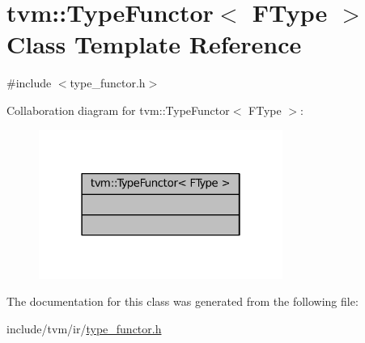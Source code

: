 \hypertarget{classtvm_1_1TypeFunctor}{}\section{tvm\+:\+:Type\+Functor$<$ F\+Type $>$ Class Template Reference}
\label{classtvm_1_1TypeFunctor}


{\ttfamily \#include $<$type\+\_\+functor.\+h$>$}



Collaboration diagram for tvm\+:\+:Type\+Functor$<$ F\+Type $>$\+:
\nopagebreak
\begin{figure}[H]
\begin{center}
\leavevmode
\includegraphics[width=226pt]{classtvm_1_1TypeFunctor__coll__graph}
\end{center}
\end{figure}


The documentation for this class was generated from the following file\+:\begin{DoxyCompactItemize}
\item 
include/tvm/ir/\hyperlink{type__functor_8h}{type\+\_\+functor.\+h}\end{DoxyCompactItemize}
